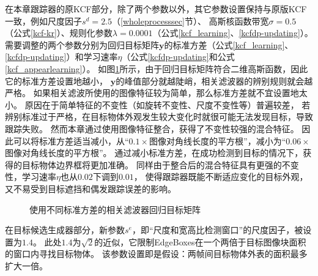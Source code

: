 在本章跟踪器的原KCF部分，除了两个参数以外，其它参数设置保持与原版KCF一致，例如尺度因子$s^d=2.5$（\ref{wholeprocesssec}节）、
高斯核函数带宽$\sigma=0.5$（公式\ref{kcf-kr}）、规则化参数$\lambda=0.0001$（公式\ref{kcf_learning}、\ref{kcfdp-updating}）。
需要调整的两个参数分别为回归目标矩阵$\mathbf{y}$的标准方差（公式\ref{kcf_learning}、\ref{kcfdp-updating}）和学习速率$\eta$（公式\ref{kcfdp-updating}和公式\ref{kcf_appearlearning}）。
如图\ref{regresstarget}所示，由于回归目标矩阵符合二维高斯函数，因此它的标准方差设置地越小，
$\mathbf{y}$的峰值部分就越陡峭，相关滤波器的辨别规则就会越严格。
如果相关滤波所使用的图像特征较为简单，那么标准方差就不宜设置地太小。
原因在于简单特征的不变性（如旋转不变性、尺度不变性等）普遍较差，
若辨别标准过于严格，在目标物体外观发生较大变化时就很可能无法发现目标，导致跟踪失败。
然而本章通过使用图像特征整合，获得了不变性较强的混合特征。
因此可以将标准方差适当减小，从``$0.1\times$图像对角线长度的平方根''，减小为``$0.06\times$图像对角线长度的平方根''。
通过减小标准方差，在成功检测到目标的情况下，获得的目标物体边界框将更加准确。
同样由于整合后的混合特征具有更强的不变性，学习速率$\eta$也从$0.02$下调到$0.01$，
使得跟踪器既能不断适应变化的目标外观，又不易受到目标遮挡和偶发跟踪误差的影响。

\begin{figure}[htb]
  \centering
  \hspace{1cm}
  \hspace{0.2cm}
  \caption{使用不同标准方差的相关滤波器回归目标矩阵}
  \label{regresstarget}
\end{figure}

在目标候选生成器部分，新参数$s^e$，即``尺度和宽高比检测窗口''的尺度因子，被设置为$1.4$。
此处$1.4$为$\sqrt{2}$的近似，它限制EdgeBoxes在一个两倍于目标图像块面积的窗口内寻找目标物体。
该参数设置即是假设：两帧间目标物体外表的面积最多扩大一倍。

